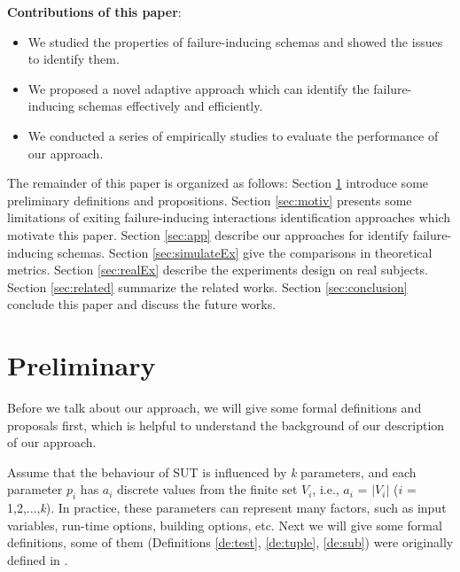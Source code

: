 \documentclass[10pt,journal,cspaper,compsoc]{IEEEtran}
\begin{document}
\textbf{Contributions of this paper}:
\begin{itemize}
  \item We studied the properties of failure-inducing schemas and showed the issues to identify them.
  \item We proposed a novel adaptive approach which can identify the failure-inducing schemas effectively and efficiently.
  \item We conducted a series of empirically studies to evaluate the performance of our approach.
\end{itemize}

The remainder of this paper is organized as follows: Section \ref{sec:back} introduce some preliminary definitions and propositions. Section \ref{sec:motiv} presents some limitations of exiting failure-inducing interactions identification approaches which motivate this paper. Section \ref{sec:app} describe our approaches for identify failure-inducing schemas. Section \ref{sec:simulateEx} give the comparisons in theoretical metrics. Section \ref{sec:realEx} describe the experiments design on real subjects. Section \ref{sec:related} summarize the related works. Section \ref{sec:conclusion} conclude this paper and discuss the future works.

\section{Preliminary} \label{sec:back}
Before we talk about our approach, we will give some formal definitions and proposals first, which is helpful to understand the background of our description of our approach.

Assume that the behaviour of SUT is influenced by \emph{k} parameters, and each parameter $p_{i}$ has $a_{i}$ discrete values from the finite set $V_{i}$, i.e., $a_{i}$ = $|V_{i}|$ ($i$ = 1,2,...,\emph{k}). In practice, these parameters can represent many factors, such as input variables, run-time options, building options, etc. Next we will give some formal definitions, some of them (Definitions \ref{de:test}, \ref{de:tuple}, \ref{de:sub}) were originally defined in \cite{nie2011survey}.
\end{document}
